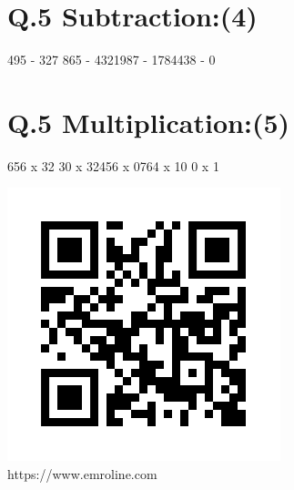 \documentclass[12pt,a4paper]{article}
\begin{document}
\section*{Q.5 Subtraction:(4)}
\begin{enumerate}
    495 - 327\hspace{60} 865 - 432\hspace{60}1987 - 1784\hspace{60}438 - 0\\
    \vspace{19} 
\end{enumerate}
\section*{Q.5 Multiplication:(5)}
\begin{enumerate}
    656 x 32\hspace{55} 30 x 32\hspace{55}456 x 0\hspace{55}764 x 10\hspace{55} 0 x 1
\end{enumerate}
\vfill
\begin{center}
\includegraphics[width=0.15\linewidth]{frame.png}\\
\caption{https://www.emroline.com}
\end{center}
\vspace{1cm}
\end{document}
